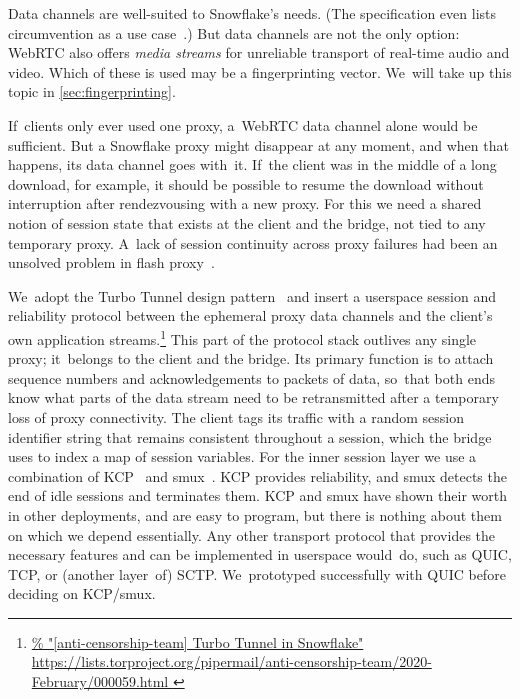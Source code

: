 \documentclass[letterpaper,twocolumn]{article}
\newcommand{\firstterm}[1]{\textit{#1}}
\newlength{\urlfootnotesize}
\newcommand{\urlfootnote}[1]{\footnote{
\raggedright\fontsize{\urlfootnotesize}{\urlfootnotesize}\selectfont\url{#1}
}}
\begin{document}
Data channels are well-suited to Snowflake's needs.
(The specification even lists circumvention as a use case~\cite[\S 3.2]{rfc8831}.)
But data channels are not the only option:
WebRTC also offers \firstterm{media streams}
for unreliable transport of real-time audio and video.
Which of these is used may be a fingerprinting vector.
We~will take up this topic in \autoref{sec:fingerprinting}.

If~clients only ever used one proxy,
a~WebRTC data channel alone would be sufficient.
But a Snowflake proxy might
disappear at any moment,
and when that happens, its data channel goes with~it.
If~the client was in the middle of a long download,
for example, it should be possible to resume the download
without interruption after rendezvousing with a new proxy.
For this we need a shared notion of session state that exists
at the client and the bridge, not tied to any temporary proxy.
A~lack of session continuity across proxy failures
had been an unsolved problem in flash proxy~\cite[\S 5.2]{Fifield2012a}.

We~adopt the
Turbo Tunnel design pattern~\cite{Fifield2020a}
and insert a userspace
session and reliability protocol
between the ephemeral proxy data channels
and the client's own application streams.\urlfootnote{
https://lists.torproject.org/pipermail/anti-censorship-team/2020-February/000059.html
}
This part of the protocol stack
outlives any single proxy; it~belongs to
the client and the bridge.
Its primary function is to attach sequence numbers and acknowledgements
to packets of data,
so~that both ends know what parts of the data stream
need to be retransmitted after a temporary loss of proxy connectivity.
The client tags its traffic
with a random session identifier string that remains
consistent throughout a session,
which the bridge uses to index a map of session variables.
For the inner session layer we use a combination of
KCP~\cite{kcp} and
smux~\cite{smux}.
KCP provides reliability,
and smux detects the end of idle sessions and terminates them.
KCP and smux have shown their worth in other deployments,
and are easy to program,
but there is nothing about them on which we depend essentially.
Any other transport protocol that provides the necessary features
and can be implemented in userspace would~do,
such as QUIC, TCP, or (another layer~of) SCTP.
We~prototyped successfully with QUIC before deciding on KCP/\allowbreak smux.

%
\end{document}
